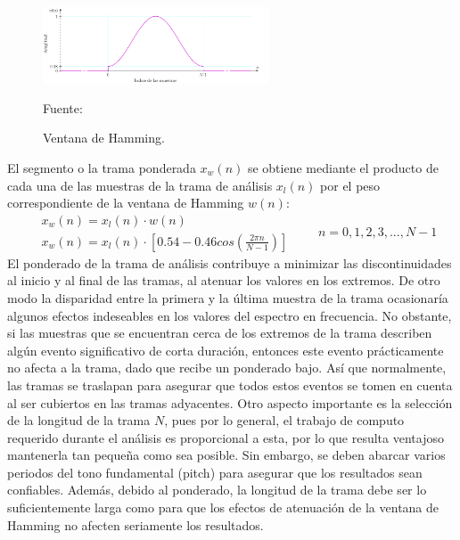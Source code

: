 \begin{enumerate}
\begin{figure}[ht]
\begin{center}
\includegraphics[width=0.6\textwidth]{Imagenes/Cap2/image036}
\end{center}
\begin{center}
\vskip -0.5cm
\caption{\small{Ventana de Hamming.}}
\label{fig:figura2.35}
{\small{Fuente: \cite{eyra}}}
\end{center}
\end{figure}
El segmento o la trama ponderada $x_{w}(n)$ se obtiene mediante el producto de cada una de las muestras de la trama de análisis $x_{l}(n)$ por el peso correspondiente de la ventana de Hamming $w(n)$:
\begin{equation}
\label{eq:ecuacion37}
\begin{aligned}
& x_{w}(n) = x_{l}(n) \cdot w(n) \\
& x_{w}(n) = x_{l}(n) \cdot \left [ 0.54 - 0.46cos\left ( \frac{2 \pi n}{N-1} \right ) \right ]
\end{aligned}
\qquad
n = 0,1,2,3,...,N-1
\end{equation}
\vskip 0.5cm
El ponderado de la trama de análisis contribuye a minimizar las discontinuidades al inicio y al final de las tramas, al atenuar los valores en los extremos. De otro modo la disparidad entre la primera y la última muestra de la trama ocasionaría algunos efectos indeseables en los valores del espectro en frecuencia. No obstante, si las muestras que se encuentran cerca de los extremos de la trama describen algún evento significativo de corta duración, entonces este evento prácticamente no afecta a la trama, dado que recibe un ponderado bajo. Así que normalmente, las tramas se traslapan para asegurar que todos estos eventos se tomen en cuenta al ser cubiertos en las tramas adyacentes.
\vskip 0.5cm
Otro aspecto importante es la selección de la longitud de la trama $N$, pues por lo general, el trabajo de computo requerido durante el análisis es proporcional a esta, por lo que resulta ventajoso mantenerla tan pequeña como sea posible. Sin embargo, se deben abarcar varios periodos del tono fundamental (pitch) para asegurar que los resultados sean confiables. Además, debido al ponderado, la longitud de la trama debe ser lo suficientemente larga como para que los efectos de atenuación de la ventana de Hamming no afecten seriamente los resultados. 

\end{enumerate}
